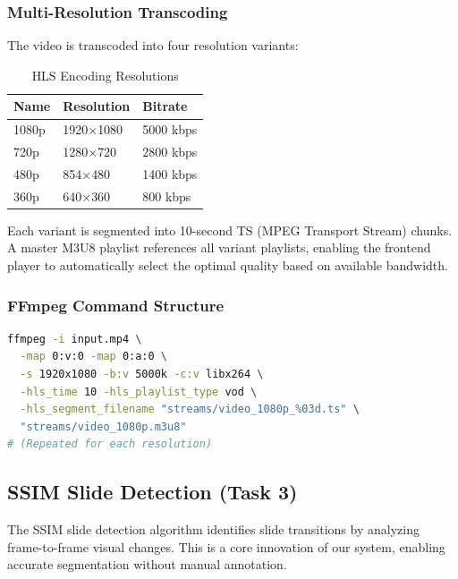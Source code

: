 \documentclass[12pt,a4paper]{article}
\begin{document}
\subsubsection{Multi-Resolution Transcoding}

The video is transcoded into four resolution variants:

\begin{table}[H]
    \centering
    \caption{HLS Encoding Resolutions}
    \begin{tabular}{@{}lll@{}}
        \toprule
        \textbf{Name} & \textbf{Resolution} & \textbf{Bitrate} \\ \midrule
        1080p & 1920$\times$1080 & 5000 kbps \\
        720p & 1280$\times$720 & 2800 kbps \\
        480p & 854$\times$480 & 1400 kbps \\
        360p & 640$\times$360 & 800 kbps \\ \bottomrule
    \end{tabular}
\end{table}

Each variant is segmented into 10-second TS (MPEG Transport Stream) chunks. A master M3U8 playlist references all variant playlists, enabling the frontend player to automatically select the optimal quality based on available bandwidth.

\subsubsection{FFmpeg Command Structure}

\begin{lstlisting}[language=bash, caption={HLS Encoding FFmpeg Command}]
ffmpeg -i input.mp4 \
  -map 0:v:0 -map 0:a:0 \
  -s 1920x1080 -b:v 5000k -c:v libx264 \
  -hls_time 10 -hls_playlist_type vod \
  -hls_segment_filename "streams/video_1080p_%03d.ts" \
  "streams/video_1080p.m3u8"
# (Repeated for each resolution)
\end{lstlisting}

\subsection{SSIM Slide Detection (Task 3)}

The SSIM slide detection algorithm identifies slide transitions by analyzing frame-to-frame visual changes. This is a core innovation of our system, enabling accurate segmentation without manual annotation.
\end{document}
